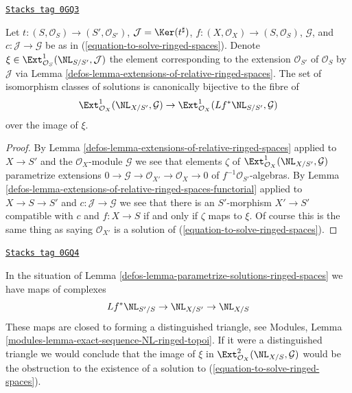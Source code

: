 \begin{lemma}
\label{defos-lemma-parametrize-solutions-ringed-spaces}
\href{https://stacks.math.columbia.edu/tag/0GQ3}{\texttt{Stacks tag 0GQ3}}

Let $t : (S, \mathcal{O}_S) \to (S', \mathcal{O}_{S'})$,
$\mathcal{J} = \Ker(t^\sharp)$,
$f : (X, \mathcal{O}_X) \to (S, \mathcal{O}_S)$, $\mathcal{G}$, and
$c : \mathcal{J} \to \mathcal{G}$ be as in
(\ref{equation-to-solve-ringed-spaces}).
Denote $\xi \in \Ext^1_{\mathcal{O}_S}(\NL_{S/S'}, \mathcal{J})$
the element corresponding to the extension $\mathcal{O}_{S'}$
of $\mathcal{O}_S$ by $\mathcal{J}$ via
Lemma \ref{defos-lemma-extensions-of-relative-ringed-spaces}.
The set of isomorphism classes of solutions is canonically bijective
to the fibre of
$$
\Ext^1_{\mathcal{O}_X}(\NL_{X/S'}, \mathcal{G}) \to
\Ext^1_{\mathcal{O}_X}(Lf^*\NL_{S/S'}, \mathcal{G})
$$
over the image of $\xi$.
\end{lemma}

\begin{proof}

By Lemma \ref{defos-lemma-extensions-of-relative-ringed-spaces}
applied to $X \to S'$ and the $\mathcal{O}_X$-module $\mathcal{G}$
we see that elements $\zeta$ of
$\Ext^1_{\mathcal{O}_X}(\NL_{X/S'}, \mathcal{G})$
parametrize extensions
$0 \to \mathcal{G} \to \mathcal{O}_{X'} \to \mathcal{O}_X \to 0$
of $f^{-1}\mathcal{O}_{S'}$-algebras. By
Lemma \ref{defos-lemma-extensions-of-relative-ringed-spaces-functorial} applied
to $X \to S \to S'$ and $c : \mathcal{J} \to \mathcal{G}$
we see that there is an $S'$-morphism
$X' \to S'$ compatible with $c$ and $f : X \to S$ if and only if
$\zeta$ maps to $\xi$. Of course this is the same thing as saying
$\mathcal{O}_{X'}$ is a
solution of (\ref{equation-to-solve-ringed-spaces}).
\end{proof}

\begin{remark}
\label{defos-remark-parametrize-solutions-ringed-spaces}
\href{https://stacks.math.columbia.edu/tag/0GQ4}{\texttt{Stacks tag 0GQ4}}

In the situation of
Lemma \ref{defos-lemma-parametrize-solutions-ringed-spaces}
we have maps of complexes
$$
Lf^*\NL_{S'/S} \to \NL_{X/S'} \to \NL_{X/S}
$$
These maps are closed to forming a distinguished triangle, see
Modules, Lemma \ref{modules-lemma-exact-sequence-NL-ringed-topoi}.
If it were a distinguished triangle we would conclude
that the image of $\xi$ in $\Ext^2_{\mathcal{O}_X}(\NL_{X/S}, \mathcal{G})$
would be the obstruction to the existence of a solution to
(\ref{equation-to-solve-ringed-spaces}).
\end{remark}

